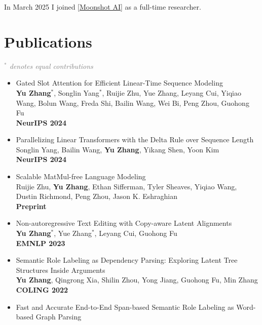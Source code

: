 \documentclass[a4paper,12pt]{article}
\begin{document}
In March 2025 I joined \href{https://www.moonshot.ai/}{[Moonshot AI]} as a full-time researcher.

\section{Publications}
\textcolor{gray}{\emph{$^*$ denotes equal contributions}}


\begin{itemize}[leftmargin=18pt]
      \item Gated Slot Attention for Efficient Linear-Time Sequence Modeling \\
            \textbf{Yu Zhang$^*$}, Songlin Yang$^*$, Ruijie Zhu, Yue Zhang, Leyang Cui, Yiqiao Wang, Bolun Wang, Freda Shi, Bailin Wang, Wei Bi, Peng Zhou, Guohong Fu \\
            \textbf{NeurIPS 2024}
      \item Parallelizing Linear Transformers with the Delta Rule over Sequence Length \\
            Songlin Yang, Bailin Wang, \textbf{Yu Zhang}, Yikang Shen, Yoon Kim \\
            \textbf{NeurIPS 2024}
      \item Scalable MatMul-free Language Modeling \\
            Ruijie Zhu, \textbf{Yu Zhang}, Ethan Sifferman, Tyler Sheaves, Yiqiao Wang, Dustin Richmond, Peng Zhou, Jason K. Eshraghian \\
            \textbf{Preprint}
      \item Non-autoregressive Text Editing with Copy-aware Latent Alignments \\
            \textbf{Yu Zhang$^*$}, Yue Zhang$^*$, Leyang Cui, Guohong Fu\\
            \textbf{EMNLP 2023}
      \item Semantic Role Labeling as Dependency Parsing: Exploring Latent Tree Structures Inside Arguments\\
            \textbf{Yu Zhang}, Qingrong Xia, Shilin Zhou, Yong Jiang, Guohong Fu, Min Zhang\\
            \textbf{COLING 2022}
      \item Fast and Accurate End-to-End Span-based Semantic Role Labeling as Word-based Graph Parsing\\

\end{itemize}
\end{document}
